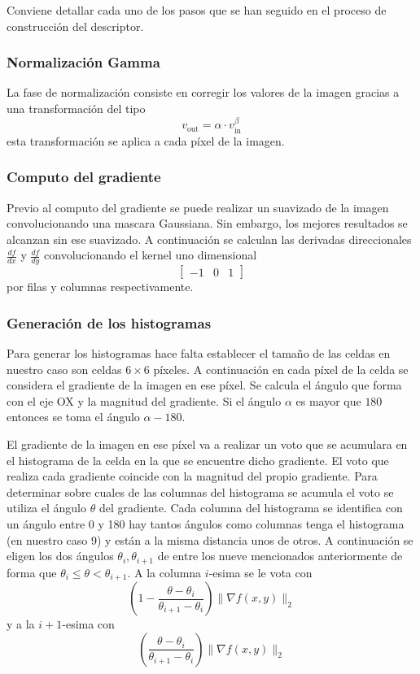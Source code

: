 \documentclass[a4paper,12pt]{article}
\begin{document}
Conviene detallar cada uno de los pasos que se han seguido en el
proceso de construcción del descriptor.

\subsubsection{Normalización Gamma}

La fase de normalización consiste en corregir los valores de la
imagen gracias a una transformación del tipo
\[
  v_{\text{out}} = \alpha \cdot v_{\text{in}}^\beta
\]
esta transformación se aplica a cada píxel de la imagen.

\subsubsection{Computo del gradiente}

Previo al computo del gradiente se puede realizar un suavizado de
la imagen convolucionando una mascara Gaussiana. Sin embargo, los mejores resultados se alcanzan sin ese suavizado.  A continuación
se calculan las derivadas direccionales $\frac{df}{dx}$ y
$\frac{df}{dy}$ convolucionando el kernel uno dimensional
\[
  \begin{bmatrix}-1 & 0 & 1\end{bmatrix}
\]
por filas y columnas respectivamente.

\subsubsection{Generación de los histogramas}

Para generar los histogramas hace falta establecer el tamaño de las
celdas en nuestro caso son celdas $6\times 6$ píxeles. A
continuación en cada píxel de la celda se considera el gradiente de
la imagen en ese píxel. Se calcula el ángulo que forma con el eje
OX y la magnitud del gradiente. Si el ángulo $\alpha$ es mayor que
$180$ entonces se toma el ángulo $\alpha - 180$.

El gradiente de la imagen en ese píxel va a realizar un voto que
se acumulara en el histograma de la celda en la que se encuentre
dicho gradiente. El voto que realiza cada gradiente coincide con
la magnitud del propio gradiente. Para determinar sobre cuales
de las columnas del histograma se acumula el voto se utiliza el
ángulo $\theta$ del gradiente. Cada columna del histograma se
identifica con un ángulo entre 0 y 180 hay tantos ángulos como
columnas tenga el histograma (en nuestro caso 9) y están a la misma
distancia unos de otros. A continuación se eligen los dos ángulos
$\theta_i,\theta_{i+1}$ de entre los nueve mencionados anteriormente
de forma que $ \theta_i \le \theta < \theta_{i+1} $. A la columna
$i$-esima se le vota con
\[
  (1-\frac{\theta-\theta_i}{\theta_{i+1} - \theta_i})\| \nabla f (x,y)\|_2
\]
y a la $i+1$-esima con
\[
  (\frac{\theta-\theta_i}{\theta_{i+1} - \theta_i})\| \nabla f (x,y)\|_2
\]
\end{document}
